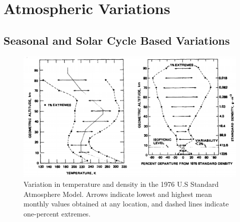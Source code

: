 \section{Atmospheric Variations}
\subsection{Seasonal and Solar Cycle Based Variations}

\begin{figure}[ht]
	\centering
	\includegraphics[width=0.8\linewidth]{figures/A1_uncertainty-analysis/AtmosphericVariation}
	\caption{Variation in temperature and density in the 1976 U.S Standard Atmosphere Model\cite{Administration1976}. Arrows indicate lowest and highest mean monthly values obtained at any location, and dashed lines indicate one-percent extremes.}
	\label{fig:AtmosphericVariation}
\end{figure}

